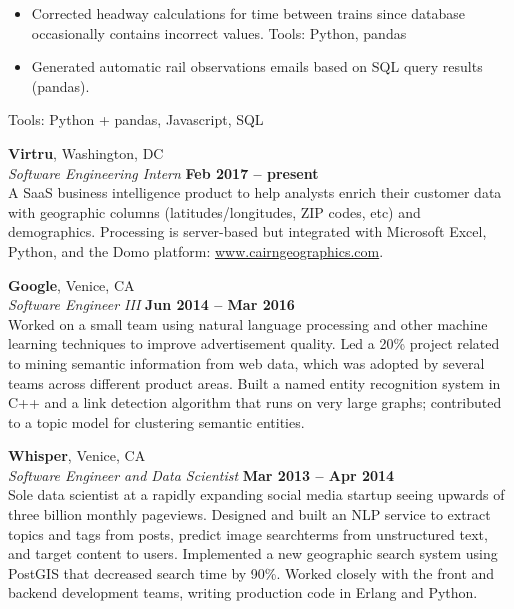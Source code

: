 \documentclass[margin,line]{resume}
\begin{document}
\begin{resume}
\begin{itemize}
\item Corrected headway calculations for time between trains since database occasionally contains incorrect values. \hfill Tools: Python, pandas

\item Generated automatic rail observations emails based on SQL query results (pandas).

    \end{itemize}
    
    \hfill Tools: Python + pandas, Javascript, SQL

    \textbf{Virtru}, Washington, DC \vspace{2mm}\\\vspace{1mm}%
    \textsl{Software Engineering Intern} \hfill \textbf{Feb 2017 -- present}\\
    A SaaS business intelligence product to help analysts enrich their customer
    data with geographic columns (latitudes/longitudes, ZIP codes, etc) and
    demographics. Processing is server-based but integrated with Microsoft
    Excel, Python, and the Domo platform: \url{www.cairngeographics.com}.

    \textbf{Google}, Venice, CA \vspace{2mm}\\\vspace{1mm}%
    \textsl{Software Engineer III} \hfill \textbf{Jun 2014 -- Mar 2016}\\
    Worked on a small team using natural language processing and other machine
    learning techniques to improve advertisement quality. Led a 20\% project
    related to mining semantic information from web data, which was adopted by
    several teams across different product areas. Built a named entity
    recognition system in C++ and a link detection algorithm that runs on very
    large graphs; contributed to a topic model for clustering semantic entities.

    \textbf{Whisper}, Venice, CA \vspace{2mm}\\\vspace{1mm}%
    \textsl{Software Engineer and Data Scientist} \hfill \textbf{Mar 2013 -- Apr 2014}\\
    Sole data scientist at a rapidly expanding social media startup
    seeing upwards of three billion monthly pageviews. Designed and built an NLP
    service to extract topics and tags from posts, predict image searchterms
    from unstructured text, and target content to users. Implemented a new
    geographic search system using PostGIS that decreased search time by
    90\%. Worked closely with the front and backend development teams, writing
    production code in Erlang and Python.



\end{resume}
\end{document}
